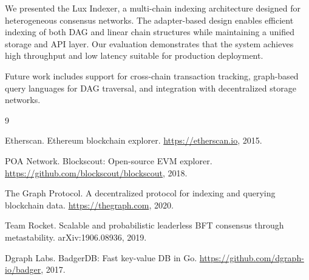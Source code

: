\documentclass[11pt,twocolumn]{article}
\begin{document}
We presented the Lux Indexer, a multi-chain indexing architecture designed for heterogeneous consensus networks. The adapter-based design enables efficient indexing of both DAG and linear chain structures while maintaining a unified storage and API layer. Our evaluation demonstrates that the system achieves high throughput and low latency suitable for production deployment.

Future work includes support for cross-chain transaction tracking, graph-based query languages for DAG traversal, and integration with decentralized storage networks.


\begin{thebibliography}{9}

Etherscan. Ethereum blockchain explorer. \url{https://etherscan.io}, 2015.

POA Network. Blockscout: Open-source EVM explorer. \url{https://github.com/blockscout/blockscout}, 2018.

The Graph Protocol. A decentralized protocol for indexing and querying blockchain data. \url{https://thegraph.com}, 2020.

Team Rocket. Scalable and probabilistic leaderless BFT consensus through metastability. arXiv:1906.08936, 2019.

Dgraph Labs. BadgerDB: Fast key-value DB in Go. \url{https://github.com/dgraph-io/badger}, 2017.

\end{thebibliography}
\end{document}
